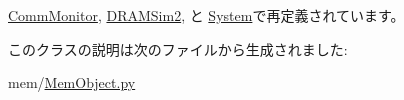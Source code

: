 \hyperlink{classCommMonitor_1_1CommMonitor_acce15679d830831b0bbe8ebc2a60b2ca}{CommMonitor}, \hyperlink{classDRAMSim2_1_1DRAMSim2_acce15679d830831b0bbe8ebc2a60b2ca}{DRAMSim2}, と \hyperlink{classSystem_1_1System_acce15679d830831b0bbe8ebc2a60b2ca}{System}で再定義されています。

このクラスの説明は次のファイルから生成されました:\begin{DoxyCompactItemize}
\item 
mem/\hyperlink{MemObject_8py}{MemObject.py}\end{DoxyCompactItemize}
